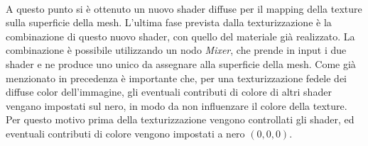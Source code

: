 \\
A questo punto si è ottenuto un nuovo shader diffuse per il mapping della texture sulla superficie della mesh. L’ultima fase prevista dalla texturizzazione è la combinazione di questo nuovo shader, con quello del materiale già realizzato. La combinazione è possibile utilizzando un nodo \emph{Mixer}, che prende in input i due shader e ne produce uno unico da assegnare alla superficie della mesh. Come già menzionato in precedenza è importante che, per una texturizzazione fedele dei diffuse color dell’immagine, gli eventuali contributi di colore di altri shader vengano impostati sul nero, in modo da non influenzare il colore della texture. Per questo motivo prima della texturizzazione vengono controllati gli shader, ed eventuali contributi di colore vengono impostati a nero $(0,0,0)$. 